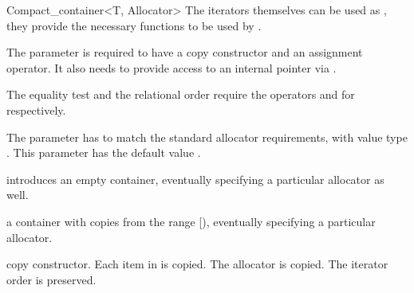 \begin{ccRefClass}{Compact_container<T, Allocator>}
  The iterators themselves can be used as , they provide the necessary
  functions to be used by .


  \ccParameters

  The parameter  is required to have a copy constructor and an
  assignment operator.  It also needs to provide access to an internal
  pointer via .

  The equality test and the relational order require the operators
  \ccStyle{==} and \ccStyle{<} for  respectively.

  The parameter  has to match the standard allocator
  requirements, with value type .  This parameter has the default
  value .

  \ccTypes
  \ccPropagateThreeToTwoColumns

  \ccGlue
  \ccGlue
  \ccGlue
  \ccGlue
  \ccGlue
  \ccGlue

  \ccGlue
  \ccGlue
  \ccGlue


  \ccCreation

  {introduces an empty container, eventually specifying a particular
   allocator  as well.}

  {a container with copies from the range [), eventually
   specifying a particular allocator.}

  {copy constructor.  Each item in  is copied.  The allocator
   is copied.  The iterator order is preserved.}


\end{ccRefClass}
